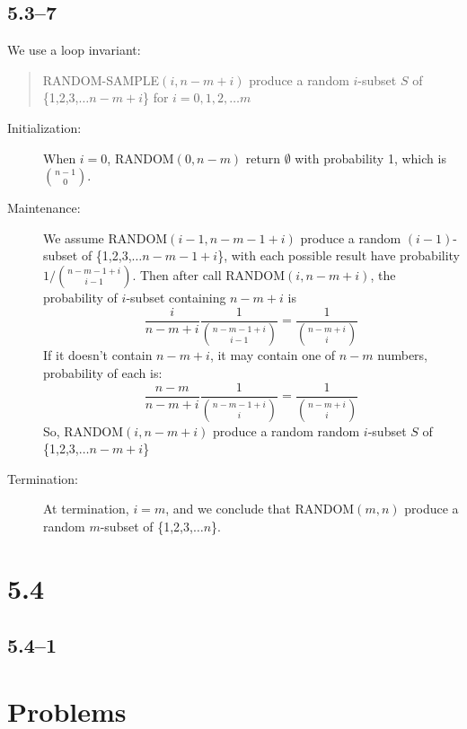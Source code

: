 \documentclass{article}
\begin{document}
\subsection*{5.3--7}
We use a loop invariant:
\begin{quote}
  RANDOM-SAMPLE$(i, n-m+i)$ produce a random $i$-subset $S$ of
  \{1,2,3,$\ldots{}n-m+i$\} for $i = 0,1,2,\ldots{}m$
\end{quote}
\begin{description}
\item[Initialization:] When $i = 0$, RANDOM$(0, n-m)$ return $\emptyset$ with
  probability 1, which is $\binom{n-1}{0}$.
\item[Maintenance:] We assume RANDOM$(i-1, n-m-1+i)$ produce a random
  \mbox{$(i-1)$-subset} of \{1,2,3,$\ldots{}n-m-1+i$\}, with each possible result have
  probability $1/\binom{n-m-1+i}{i-1}$. Then after call RANDOM$(i, n-m+i)$, the
  probability of $i$-subset containing $n-m+i$ is 
\[\frac{i}{n-m+i}\frac{1}{\binom{n-m-1+i}{i-1}} = \frac{1}{\binom{n-m+i}{i}}\]
If it doesn't contain $n-m+i$, it may contain one of $n-m$ numbers, probability of
each is:
\[\frac{n-m}{n-m+i}\frac{1}{\binom{n-m-1+i}{i}} = \frac{1}{\binom{n-m+i}{i}}\]
So, RANDOM$(i, n-m+i)$ produce a random random $i$-subset $S$ of
\{1,2,3,$\ldots{}n-m+i$\}
\item[Termination:] At termination, $i = m$, and we conclude that RANDOM$(m, n)$
  produce a random $m$-subset of \{1,2,3,$\ldots{}n$\}.
\end{description}

\section*{5.4}
\subsection*{5.4--1}

\section*{Problems}
\end{document}
